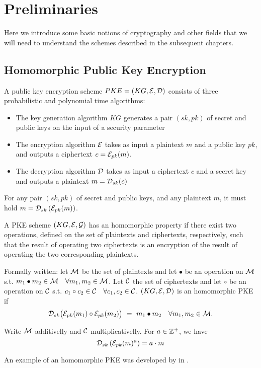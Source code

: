 \chapter{Preliminaries}
\label{chap:pre}
Here we introduce some basic notions of cryptography and other fields that we will need to understand the schemes described in the subsequent chapters.

\section{Homomorphic Public Key Encryption}
A public key encryption scheme $PKE = (KG, \mathcal{E}, \mathcal{D})$ consists of three probabilistic and polynomial time algorithms:
\begin{itemize}[align = left, leftmargin=*, label={--}]
\item The key generation algorithm $KG$ generates a pair $(sk,pk)$ of secret and public keys on the input of a security parameter
\item The encryption algorithm $\mathcal{E}$ takes as input a plaintext $m$ and a public key $pk$, and outputs a ciphertext $c = \mathcal{E}_{pk}(m)$.
\item The decryption algorithm $\mathcal{D}$ takes as input a ciphertext $c$ and a secret key and outputs a plaintext $m = \mathcal{D}_{sk}(c)$
\end{itemize}

For any pair $(sk,pk)$ of secret and public keys, and any plaintext $m$, it must hold $m = \mathcal{D}_{sk} \left( \mathcal{E}_{pk} (m) \right)$.

A PKE scheme $(KG,\mathcal{E},\mathcal{G})$ has an homomorphic property if there exist two operations, defined on the set of plaintexts and ciphertexts, respectively, such that the result of operating two ciphertexts is an encryption of the result of operating the two corresponding plaintexts.

Formally written: let $\mathcal{M}$ be the set of plaintexts and let $\bullet$ be an operation on $\mathcal{M}$ s.t. $m_1 \bullet m_2 \in \mathcal{M} \quad \forall m_1,m_2 \in \mathcal{M}$. Let $\mathcal{C}$ the set of ciphertexts and let $\circ$ be an operation on $\mathcal{C}$ s.t. $c_1 \circ c_2 \in \mathcal{C} \quad \forall c_1,c_2 \in \mathcal{C}$. $(KG,\mathcal{E},\mathcal{D})$ is an homomorphic PKE if
$$
\mathcal{D}_{sk} \big( \mathcal{E}_{pk}(m_1) \circ \mathcal{E}_{pk}(m_2) \big) \ = \ m_1 \bullet m_2 \quad \forall m_1,m_2 \in \mathcal{M}.
$$

Write $\mathcal{M}$ additivelly and $\mathcal{C}$ multiplicativelly. For $a \in {\mathbb Z}^+$, we have $$\mathcal{D}_{sk} \left( \mathcal{E}_{pk} (m)^a \right) = a \cdot m$$

An example of an homomorphic PKE was developed by \citeauthor{elGamal85} in \cite{elGamal85}.

